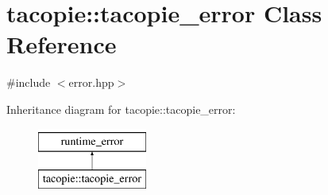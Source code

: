 \hypertarget{classtacopie_1_1tacopie__error}{}\section{tacopie\+:\+:tacopie\+\_\+error Class Reference}
\label{classtacopie_1_1tacopie__error}


{\ttfamily \#include $<$error.\+hpp$>$}

Inheritance diagram for tacopie\+:\+:tacopie\+\_\+error\+:\begin{figure}[H]
\begin{center}
\leavevmode
\includegraphics[height=2.000000cm]{classtacopie_1_1tacopie__error}
\end{center}
\end{figure}
